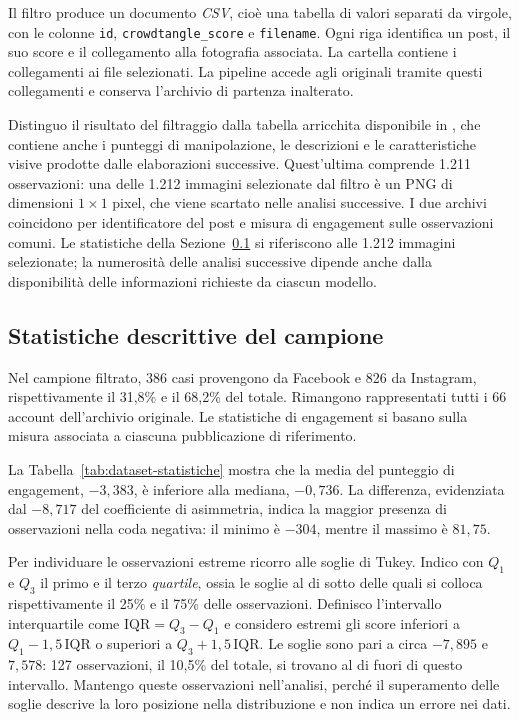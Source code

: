 Il filtro produce un documento \emph{CSV}, cioè una tabella di valori separati da virgole, con le colonne \texttt{id}, \texttt{crowdtangle\_score} e \texttt{filename}. Ogni riga identifica un post, il suo score e il collegamento alla fotografia associata. La cartella  contiene i collegamenti ai file selezionati. La pipeline accede agli originali tramite questi collegamenti e conserva l'archivio di partenza inalterato.

Distinguo il risultato del filtraggio dalla tabella arricchita disponibile in , che contiene anche i punteggi di manipolazione, le descrizioni e le caratteristiche visive prodotte dalle elaborazioni successive. Quest'ultima comprende 1.211 osservazioni: una delle 1.212 immagini selezionate dal filtro è un PNG di dimensioni $1 \times 1$ pixel, che viene scartato nelle analisi successive. I due archivi coincidono per identificatore del post e misura di engagement sulle osservazioni comuni. Le statistiche della Sezione~\ref{sec:dataset-statistiche} si riferiscono alle 1.212 immagini selezionate; la numerosità delle analisi successive dipende anche dalla disponibilità delle informazioni richieste da ciascun modello.

\subsection{Statistiche descrittive del campione}
\label{sec:dataset-statistiche}

Nel campione filtrato, 386 casi provengono da Facebook e 826 da Instagram, rispettivamente il 31,8\% e il 68,2\% del totale. Rimangono rappresentati tutti i 66 account dell'archivio originale. Le statistiche di engagement si basano sulla misura associata a ciascuna pubblicazione di riferimento.

La Tabella~\ref{tab:dataset-statistiche} mostra che la media del punteggio di engagement, $-3{,}383$, è inferiore alla mediana, $-0{,}736$. La differenza, evidenziata dal $-8{,}717$ del coefficiente di asimmetria, indica la maggior presenza di osservazioni nella coda negativa: il minimo è $-304$, mentre il massimo è $81{,}75$.

Per individuare le osservazioni estreme ricorro alle soglie di Tukey. Indico con $Q_1$ e $Q_3$ il primo e il terzo \emph{quartile}, ossia le soglie al di sotto delle quali si colloca rispettivamente il 25\% e il 75\% delle osservazioni. Definisco l'intervallo interquartile come $\mathrm{IQR}=Q_3-Q_1$ e considero estremi gli score inferiori a $Q_1-1{,}5\,\mathrm{IQR}$ o superiori a $Q_3+1{,}5\,\mathrm{IQR}$. Le soglie sono pari a circa $-7{,}895$ e $7{,}578$: 127 osservazioni, il 10,5\% del totale, si trovano al di fuori di questo intervallo. Mantengo queste osservazioni nell'analisi, perché il superamento delle soglie descrive la loro posizione nella distribuzione e non indica un errore nei dati.

